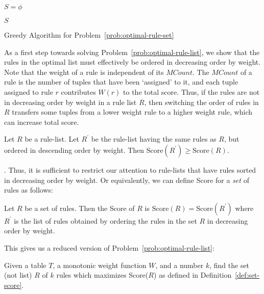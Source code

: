 \begin{algorithm}
\scriptsize
{}
$S = \phi$ 

\Return $S$
\caption{Greedy Algorithm for Problem~\ref{prob:optimal-rule-set}\label{algo:best-rule-set}}
\end{algorithm}

As a first step towards solving Problem~\ref{prob:optimal-rule-list}, we show that the rules in the optimal list must effectively be ordered in decreasing order by weight. Note that the weight of a rule is independent of its $MCount$. The $MCount$ of a rule is the number of tuples that have been `assigned' to it, and each tuple assigned to rule $r$ contributes $W(r)$ to the total score. Thus, if the rules are not in decreasing order by weight in a rule list $R$, then switching the order of rules in $R$ transfers some tuples from a lower weight rule to a higher weight rule, which can increase total score.

\begin{lemma}\label{lemma:rule-ordering}
Let $R$ be a rule-list. Let $R^{\prime}$ be the rule-list having the same rules as $R$, but ordered in descending order by weight. Then
$\text{Score}(R^{\prime}) \geq \text{Score}(R)$.
\end{lemma}
. 
Thus, it is sufficient to restrict our attention to rule-lists that have rules sorted in decreasing order by weight. Or equivalently, we can define Score for a \emph{set} of rules as follows:

\begin{definition}\label{def:set-score}
Let $R$ be a set of rules. Then the Score of $R$ is
$\text{Score}(R) = \text{Score}(R^{\prime})$
where $R^{\prime}$ is the list of rules obtained by ordering the rules in the set $R$ in decreasing order by weight.
\end{definition}

This gives us a reduced version of Problem~\ref{prob:optimal-rule-list}: 
\begin{problem}\label{prob:optimal-rule-set}
Given a table $T$, a monotonic weight function $W$, and a number $k$, find the set (not list) $R$ of $k$ rules which maximizes Score($R$) as defined in Definition~\ref{def:set-score}.
\end{problem}

